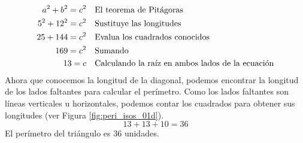 \begin{solutionbox}{14cm}
\begin{minipage}{0.55\textwidth}
        \begin{align*}
            a^2+b^2  =c^2  & \text{\quad El teorema de Pitágoras}                          \\
            5^2+12^2  =c^2 & \text{\quad Sustituye las longitudes}                         \\
            25 +144 =c^2   & \text{\quad Evalua los cuadrados conocidos}                   \\
            169=c^2        & \text{\quad Sumando }                                         \\
            13=c           & \text{\quad Calculando la raíz en ambos lados de la ecuación} \\
        \end{align*}
        Ahora que conocemos la longitud de la diagonal, podemos encontrar la longitud de los lados faltantes para calcular el perímetro.
        Como los lados faltantes son líneas verticales u horizontales, podemos contar los cuadrados para obtener sus longitudes (ver Figura \ref{fig:peri_isos_01d}).
        \[13+13+10=36\]
        El perímetro del triángulo es 36 unidades.
    \end{minipage}
\end{solutionbox}
